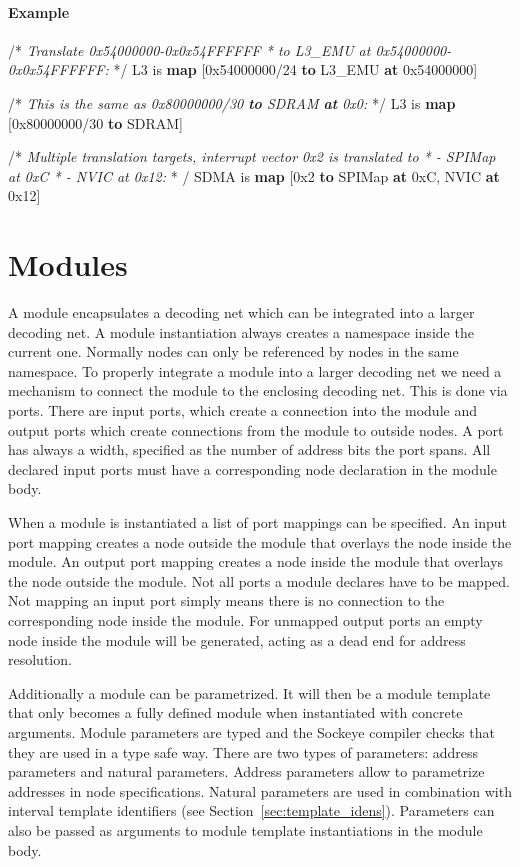 \documentclass[a4paper,11pt,twoside]{report}
\begin{document}
{{{\paragraph{Example}
\begin{syntax}
    /* \textit{Translate \textup{0x54000000-0x0x54FFFFFF}
     * to \textup{L3_EMU} at \textup{0x54000000-0x0x54FFFFFF}:}
     */
    L3 is \textbf{map} [0x54000000/24 \textbf{to} L3_EMU \textbf{at} 0x54000000] 

    /* \textit{This is the same as \textup{0x80000000/30 \textbf{to} SDRAM \textbf{at} 0x0}:} */
    L3 is \textbf{map} [0x80000000/30 \textbf{to} SDRAM]

    /* \textit{Multiple translation targets, interrupt vector \textup{0x2} is translated to
     * - \textup{SPIMap} at \textup{0xC}
     * - \textup{NVIC} at \textup{0x12}:}
     * /
    SDMA is \textbf{map} [0x2 \textbf{to} SPIMap \textbf{at} 0xC, NVIC \textbf{at} 0x12]
\end{syntax}

\section{Modules}
\label{sec:modules}
A module encapsulates a decoding net which can be integrated into a larger decoding net.
A module instantiation always creates a namespace inside the current one.
Normally nodes can only be referenced by nodes in the same namespace.
To properly integrate a module into a larger decoding net we need a mechanism to connect the module to the enclosing decoding net.
This is done via ports.
There are input ports, which create a connection into the module and output ports which create connections from the module to outside nodes.
A port has always a width, specified as the number of address bits the port spans.
All declared input ports must have a corresponding node declaration in the module body.

When a module is instantiated a list of port mappings can be specified.
An input port mapping creates a node outside the module that overlays the node inside the module.
An output port mapping creates a node inside the module that overlays the node outside the module.
Not all ports a module declares have to be mapped.
Not mapping an input port simply means there is no connection to the corresponding node inside the module.
For unmapped output ports an empty node inside the module will be generated, acting as a dead end for address resolution.

Additionally a module can be parametrized.
It will then be a module template that only becomes a fully defined module when instantiated with concrete arguments.
Module parameters are typed and the Sockeye compiler checks that they are used in a type safe way.
There are two types of parameters: address parameters and natural parameters.
Address parameters allow to parametrize addresses in node specifications.
Natural parameters are used in combination with interval template identifiers (see Section~\ref{sec:template_idens}).
Parameters can also be passed as arguments to module template instantiations in the module body.

}}}
\end{document}

